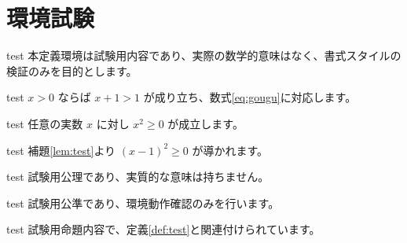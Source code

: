 \documentclass[jp]{../../elegantbook}
\begin{document}
\section{環境試験}

\ifdefined\simpleTest
\begin{definition}[試験定義]\label{def:test}
\else
\begin{definition}[試験定義]{test}
\fi
本定義環境は試験用内容であり、実際の数学的意味はなく、書式スタイルの検証のみを目的とします。
\end{definition}

\ifdefined\simpleTest
\begin{theorem}[試験定理]\label{thm:test}
\else
\begin{theorem}[試験定理]{test}
\fi
$x>0$ ならば $x+1>1$ が成り立ち、数式\eqref{eq:gougu}に対応します。
\end{theorem}

\ifdefined\simpleTest
\begin{lemma}[試験補題]\label{lem:test}
\else
\begin{lemma}[試験補題]{test}
\fi
任意の実数 $x$ に対し $x^2\geq0$ が成立します。
\end{lemma}

\ifdefined\simpleTest
\begin{corollary}[試験系]\label{cor:test}
\else
\begin{corollary}[試験系]{test}
\fi
補題\ref{lem:test}より $(x-1)^2\geq0$ が導かれます。
\end{corollary}

\ifdefined\simpleTest
\begin{axiom}[試験公理]\label{axi:test}
\else
\begin{axiom}[試験公理]{test}
\fi
試験用公理であり、実質的な意味は持ちません。
\end{axiom}

\ifdefined\simpleTest
\begin{postulate}[試験公準]\label{pos:test}
\else
\begin{postulate}[試験公準]{test}
\fi
試験用公準であり、環境動作確認のみを行います。
\end{postulate}

\ifdefined\simpleTest
\begin{proposition}[試験命題]\label{pro:test}
\else
\begin{proposition}[試験命題]{test}
\fi
試験用命題内容で、定義\ref{def:test}と関連付けられています。
\end{proposition}


\end{proposition}
\end{postulate}
\end{axiom}
\end{corollary}
\end{lemma}
\end{theorem}
\end{definition}
\end{document}
